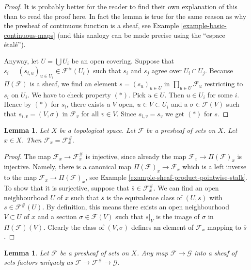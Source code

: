 \documentclass{stacks-project}
\theoremstyle{plain}
\newtheorem{lemma}[subsection]{Lemma}
\theoremstyle{definition}
\theoremstyle{remark}
\numberwithin{equation}{subsection}
\begin{document}
\begin{proof}
It is probably better for the reader to find their own explanation
of this than to read the proof here. In fact the lemma is true
for the same reason as why the presheaf of continuous
function is a sheaf, see Example \ref{example-basic-continuous-maps}
(and this analogy can be made precise using the ``espace \'etal\'e'').

\medskip\noindent
Anyway, let $U = \bigcup U_i$ be an open covering.
Suppose that $s_i = (s_{i, u})_{u \in U_i} \in \mathcal{F}^{\#}(U_i)$
such that $s_i$ and $s_j$ agree over $U_i \cap U_j$.
Because $\Pi(\mathcal{F})$ is a sheaf,
we find an element $s = (s_u)_{u\in U}$ in $\prod_{u\in U} \mathcal{F}_u$
restricting to $s_i$ on $U_i$. We have to check property $(*)$.
Pick $u \in U$. Then $u \in U_i$ for some $i$. Hence by $(*)$ for $s_i$,
there exists a $V$ open, $u \in V \subset U_i$
and a $\sigma \in \mathcal{F}(V)$
such that $s_{i, v} = (V, \sigma)$ in $\mathcal{F}_v$
for all $v \in V$. Since $s_{i, v} = s_v$ we get $(*)$ for $s$.
\end{proof}

\begin{lemma}
\label{lemma-stalk-sheafification}
Let $X$ be a topological space.
Let $\mathcal{F}$ be a presheaf of sets on $X$.
Let $x \in X$. Then $\mathcal{F}_x = \mathcal{F}^\#_x$.
\end{lemma}

\begin{proof}
The map $\mathcal{F}_x \to \mathcal{F}^\#_x$
is injective, since already the map
$\mathcal{F}_x \to \Pi(\mathcal{F})_x$ is injective.
Namely, there is a canonical map $\Pi(\mathcal{F})_x \to \mathcal{F}_x$
which is a left inverse to the map $\mathcal{F}_x \to \Pi(\mathcal{F})_x$,
see Example \ref{example-sheaf-product-pointwise-stalk}.
To show that it is surjective, suppose that
$\overline{s} \in \mathcal{F}^\#_x$.
We can find an open neighbourhood $U$ of $x$ such that
$\overline{s}$ is the equivalence class of $(U, s)$
with $s \in \mathcal{F}^\#(U)$.
By definition, this means there exists an open neighbourhood
$V \subset U$ of $x$ and a section $\sigma \in \mathcal{F}(V)$
such that $s|_V$ is the image of $\sigma$ in $\Pi(\mathcal{F})(V)$.
Clearly the class of $(V, \sigma)$ defines an element of
$\mathcal{F}_x$ mapping to $\overline{s}$.
\end{proof}

\begin{lemma}
\label{lemma-sheafify-universal}
Let $\mathcal{F}$ be a presheaf of sets on $X$.
Any map $\mathcal{F} \to \mathcal{G}$ into a sheaf of sets
factors uniquely as
$\mathcal{F} \to \mathcal{F}^\# \to \mathcal{G}$.
\end{lemma}
\end{document}
